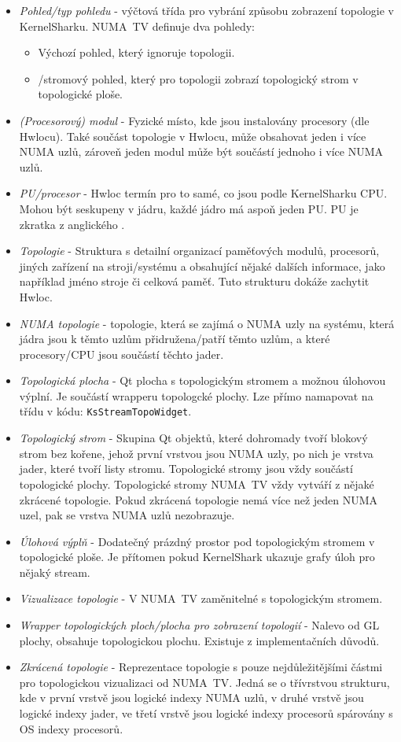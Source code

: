 \begin{itemize}
    \item \emph{Pohled/typ pohledu} - výčtová třída pro vybrání způsobu zobrazení topologie v KernelSharku. NUMA~TV definuje dva pohledy:
    \begin{itemize}
        \item Výchozí pohled, který ignoruje topologii.
        \item {}/stromový pohled, který pro topologii zobrazí topologický strom v topologické ploše.
    \end{itemize} 
    \item \emph{(Procesorový) modul} - Fyzické místo, kde jsou instalovány procesory (dle Hwlocu). Také součást topologie v Hwlocu, může obsahovat jeden i více NUMA uzlů, zároveň jeden modul může být součástí jednoho i více NUMA uzlů.
    \item \emph{PU/procesor} - Hwloc termín pro to samé, co jsou podle KernelSharku CPU. Mohou být seskupeny v jádru, každé jádro má aspoň jeden PU. PU je zkratka z anglického .
    \item \emph{Topologie} - Struktura s detailní organizací paměťových modulů, procesorů, jiných zařízení na stroji/systému a obsahující nějaké dalších informace, jako například jméno stroje či celková paměť. Tuto strukturu dokáže zachytit Hwloc.
    \item \emph{NUMA topologie} - topologie, která se zajímá o NUMA uzly na systému, která jádra jsou k těmto uzlům přidružena/patří těmto uzlům, a které procesory/CPU jsou součástí těchto jader.   
    \item \emph{Topologická plocha} - Qt plocha s topologickým stromem a možnou úlohovou výplní. Je součástí wrapperu topologcké plochy. Lze přímo namapovat na třídu v kódu: \texttt{KsStreamTopoWidget}.
    \item \emph{Topologický strom} - Skupina Qt objektů, které dohromady tvoří blokový strom bez kořene, jehož první vrstvou jsou NUMA uzly, po nich je vrstva jader, které tvoří listy stromu. Topologické stromy jsou vždy součástí topologické plochy. Topologické stromy NUMA~TV vždy vytváří z nějaké zkrácené topologie. Pokud zkrácená topologie nemá více než jeden NUMA uzel, pak se vrstva NUMA uzlů nezobrazuje.
    \item \emph{Úlohová výplň} - Dodatečný prázdný prostor pod topologickým stromem v topologické ploše. Je přítomen pokud KernelShark ukazuje grafy úloh pro nějaký stream.
    \item \emph{Vizualizace topologie} - V NUMA~TV zaměnitelné s topologickým stromem.
    \item \emph{Wrapper topologických ploch/plocha pro zobrazení topologií} - Nalevo od GL plochy, obsahuje topologickou plochu. Existuje z implementačních důvodů.
    \item \emph{Zkrácená topologie} - Reprezentace topologie s pouze nejdůležitějšími částmi pro topologickou vizualizaci od NUMA~TV. Jedná se o třívrstvou strukturu, kde v první vrstvě jsou logické indexy NUMA uzlů, v druhé vrstvě jsou logické indexy jader, ve třetí vrstvě jsou logické indexy procesorů spárovány s OS indexy procesorů.
\end{itemize}

